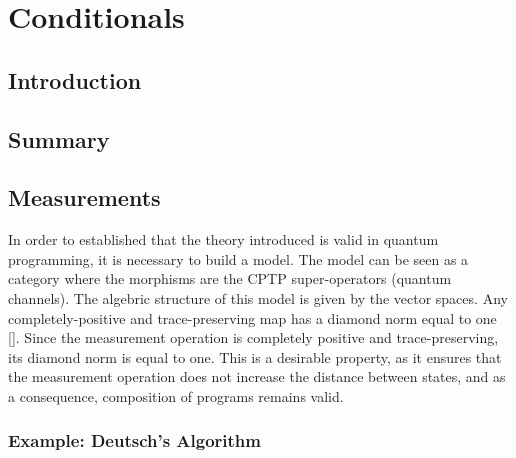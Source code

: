 \chapter{Conditionals}





\section{Introduction}

\section{Summary}



\section{Measurements}

In order to established that the theory introduced is valid in quantum programming, it is necessary to build a model. The model can be seen as a category where the morphisms are the CPTP super-operators (quantum channels). The algebric structure of this model is given by the vector spaces. 
Any completely-positive and trace-preserving map has a diamond norm equal to one [\cite{watrous2018theory}]. Since the measurement operation is completely positive and trace-preserving, its  diamond norm is equal to one. This is a desirable property, as it ensures that the measurement operation does not increase the distance between states, and as a consequence, composition of programs remains valid.


\subsection{Example: Deutsch's Algorithm}

